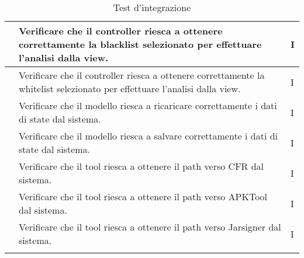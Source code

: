 \begin{center}
\begin{longtable}{ |C{3cm} | C{8.5cm}| C{1.5cm} |}
         &Verificare che il controller riesca a ottenere correttamente la blacklist selezionato per effettuare l'analisi dalla view.& I \\\hline
         &Verificare che il controller riesca a ottenere correttamente la whitelist selezionato per effettuare l'analisi dalla view.& I \\\hline
         &Verificare che il modello riesca a ricaricare correttamente i dati di state dal sistema.& I \\\hline
         &Verificare che il modello riesca a salvare correttamente i dati di state dal sistema.& I \\\hline
         &Verificare che il tool riesca a ottenere il path verso CFR dal sistema.& I \\\hline
         &Verificare che il tool riesca a ottenere il path verso APKTool dal sistema.& I \\\hline
         &Verificare che il tool riesca a ottenere il path verso Jarsigner dal sistema.& I \\\hline
        \caption{Test d'integrazione}
    \end{longtable}
\end{center}
\setcounter{rowcount}{0}

